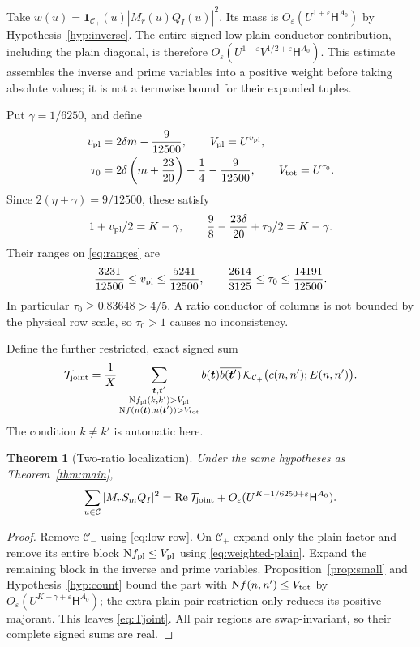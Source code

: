\documentclass[11pt]{article}
\newtheorem{theorem}{Theorem}[section]
\theoremstyle{definition}
\theoremstyle{remark}
\numberwithin{equation}{section}
\newcommand{\Nm}{\mathrm N}
\newcommand{\CC}{\mathcal C}
\newcommand{\HH}{\mathsf H}
\newcommand{\ind}{\mathbf1}
\newcommand{\Rea}{\operatorname{Re}}
\newcommand{\ee}{\varepsilon}
\newcommand{\st}{\boldsymbol t}
\newcommand{\conj}[1]{\overline{#1}}
\begin{document}
Take $w(u)=\ind_{\CC_+}(u)|M_r(u)Q_I(u)|^2$. Its mass is
$O_\ee(U^{1+\ee}\HH^{A_0})$ by Hypothesis~\ref{hyp:inverse}.
The entire signed low-plain-conductor contribution, including the
plain diagonal, is therefore $O_\ee(U^{1+\ee}V^{1/2+\ee}\HH^{A_0})$.
This estimate assembles the inverse and prime variables into a positive
weight before taking absolute values; it is not a termwise bound for
their expanded tuples.

Put $\gamma=1/6250$, and define
\begin{align}
v_{\rm pl}&=2\delta m-\frac9{12500},\qquad
 V_{\rm pl}=U^{v_{\rm pl}},\label{eq:plain-threshold}\\
\tau_0&=2\delta\left(m+\frac{23}{20}\right)
 -\frac14-\frac9{12500},\qquad
 V_{\rm tot}=U^{\tau_0}.\label{eq:total-threshold}
\end{align}
Since $2(\eta+\gamma)=9/12500$, these satisfy
\[
1+v_{\rm pl}/2=K-\gamma,\qquad
\frac98-\frac{23\delta}{20}+\tau_0/2=K-\gamma.
\]
Their ranges on \eqref{eq:ranges} are
\begin{equation}\label{eq:threshold-ranges}
\frac{3231}{12500}\le v_{\rm pl}\le\frac{5241}{12500},\qquad
\frac{2614}{3125}\le\tau_0\le\frac{14191}{12500}.
\end{equation}
In particular $\tau_0\ge0.83648>4/5$. A ratio conductor of columns
is not bounded by the physical row scale, so $\tau_0>1$ causes no
inconsistency.

Define the further restricted, exact signed sum
\begin{equation}\label{eq:Tjoint}
\mathcal T_{\rm joint}=\frac1X
\sum_{\substack{\st,\st'\\
 \Nm f_{\rm pl}(k,k')>V_{\rm pl}\\
 \Nm f(n(\st),n(\st'))>V_{\rm tot}}}
b(\st)\conj{b(\st')}\,
\mathcal K_{\CC_+}\bigl(c(n,n');E(n,n')\bigr).
\end{equation}
The condition $k\ne k'$ is automatic here.

\begin{theorem}[Two-ratio localization]\label{thm:two-ratios}
Under the same hypotheses as Theorem~\ref{thm:main},
\begin{equation}\label{eq:two-ratio-reduction}
\sum_{u\in\CC}|M_rS_mQ_I|^2
=\Rea\mathcal T_{\rm joint}
+O_\ee(U^{K-1/6250+\ee}\HH^{A_0}).
\end{equation}
\end{theorem}
\begin{proof}
Remove $\CC_-$ using \eqref{eq:low-row}. On $\CC_+$ expand only
the plain factor and remove its entire block $\Nm f_{\rm pl}\le
V_{\rm pl}$ using \eqref{eq:weighted-plain}. Expand the remaining
block in the inverse and prime variables. Proposition~\ref{prop:small}
and Hypothesis~\ref{hyp:count} bound the part with
$\Nm f(n,n')\le V_{\rm tot}$ by $O_\ee(U^{K-\gamma+\ee}\HH^{A_0})$;
the extra plain-pair restriction only reduces its positive majorant.
This leaves \eqref{eq:Tjoint}. All pair regions are swap-invariant,
so their complete signed sums are real.
\end{proof}
\end{document}
